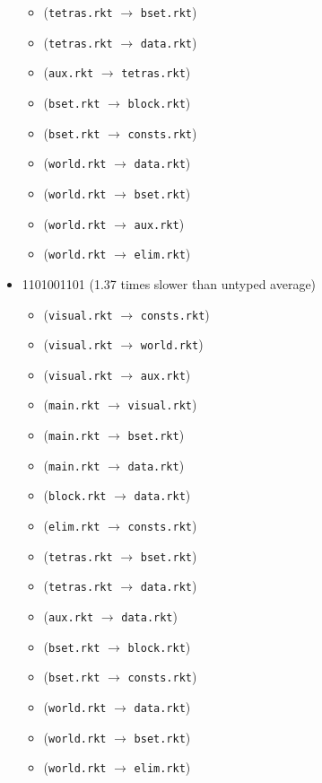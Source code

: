 \documentclass{article}
\newcommand{\mono}[1]{\texttt{#1}}
\begin{document}
\begin{itemize}
\begin{itemize}
  \item (\mono{tetras.rkt} $\rightarrow$ \mono{bset.rkt})
  \item (\mono{tetras.rkt} $\rightarrow$ \mono{data.rkt})
  \item (\mono{aux.rkt} $\rightarrow$ \mono{tetras.rkt})
  \item (\mono{bset.rkt} $\rightarrow$ \mono{block.rkt})
  \item (\mono{bset.rkt} $\rightarrow$ \mono{consts.rkt})
  \item (\mono{world.rkt} $\rightarrow$ \mono{data.rkt})
  \item (\mono{world.rkt} $\rightarrow$ \mono{bset.rkt})
  \item (\mono{world.rkt} $\rightarrow$ \mono{aux.rkt})
  \item (\mono{world.rkt} $\rightarrow$ \mono{elim.rkt})
  \end{itemize}
\item 1101001101 (1.37 times slower than untyped average)
  \begin{itemize}
  \item (\mono{visual.rkt} $\rightarrow$ \mono{consts.rkt})
  \item (\mono{visual.rkt} $\rightarrow$ \mono{world.rkt})
  \item (\mono{visual.rkt} $\rightarrow$ \mono{aux.rkt})
  \item (\mono{main.rkt} $\rightarrow$ \mono{visual.rkt})
  \item (\mono{main.rkt} $\rightarrow$ \mono{bset.rkt})
  \item (\mono{main.rkt} $\rightarrow$ \mono{data.rkt})
  \item (\mono{block.rkt} $\rightarrow$ \mono{data.rkt})
  \item (\mono{elim.rkt} $\rightarrow$ \mono{consts.rkt})
  \item (\mono{tetras.rkt} $\rightarrow$ \mono{bset.rkt})
  \item (\mono{tetras.rkt} $\rightarrow$ \mono{data.rkt})
  \item (\mono{aux.rkt} $\rightarrow$ \mono{data.rkt})
  \item (\mono{bset.rkt} $\rightarrow$ \mono{block.rkt})
  \item (\mono{bset.rkt} $\rightarrow$ \mono{consts.rkt})
  \item (\mono{world.rkt} $\rightarrow$ \mono{data.rkt})
  \item (\mono{world.rkt} $\rightarrow$ \mono{bset.rkt})
  \item (\mono{world.rkt} $\rightarrow$ \mono{elim.rkt})

\end{itemize}
\end{itemize}
\end{document}
